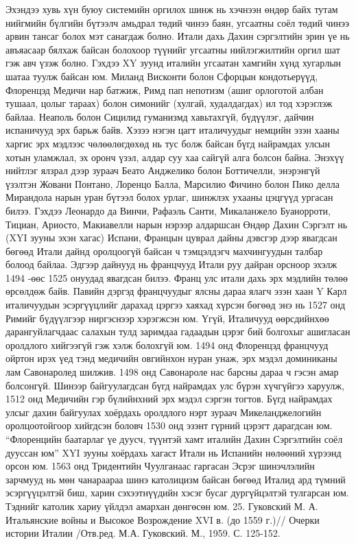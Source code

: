 Эхэндээ хувь хүн буюу системийн оргилох шинж нь хэчнээн өндөр байх тутам нийгмийн бүлгийн бүтээлч амьдрал төдий чинээ баян, угсаатны соёл төдий чинээ арвин тансаг болох мэт санагдаж болно. Итали дахь Дахин сэргэлтийн эрин үе нь авъяасаар бялхаж байсан болохоор түүнийг угсаатны нийлэгжилтийн оргил шат гэж авч үзэж болно. Гэхдээ XY зуунд италийн угсаатан хамгийн хүнд хугарлын шатаа туулж байсан юм. Миланд Висконти болон Сфорцын кондотьерүүд, Флоренцэд Медичи нар батжиж, Римд пап непотизм (ашиг орлоготой албан тушаал, цолыг тараах) болон симонийг (хулгай, худалдагдах) ил тод хэрэглэж байлаа. Неаполь болон Сицилид гуманизмд хавьтахгүй, бүдүүлэг, дайчин испаничууд эрх барьж байв. Хэзээ нэгэн цагт италичуудыг немцийн эзэн хааны харгис эрх мэдлээс чөлөөлөгдөхөд нь тус болж байсан бүгд найрамдах улсын хотын уламжлал, эх оронч үзэл, алдар суу хаа сайгүй алга болсон байна. Энэхүү нийтлэг ялзрал дээр зураач Беато Анджелико болон Боттичелли, энэрэнгүй үзэлтэн Жовани Понтано, Лоренцо Балла, Марсилио Фичино болон Пико делла Мирандола нарын уран бүтээл болох урлаг, шинжлэх ухааны цэцгүүд ургасан билээ.
Гэхдээ Леонардо да Винчи, Рафаэль Санти, Микаланжело Буанорроти, Тициан, Ариосто, Макиавелли нарын нэрээр алдаршсан Өндөр Дахин Сэргэлт нь (XYI зууны эхэн хагас) Испани, Францын цуврал дайны дэвсгэр дээр явагдсан бөгөөд Итали дайнд оролцоогүй байсан ч тэмцэлдэгч махчингуудын талбар болоод байлаа. Эдгээр дайнууд нь францчууд Итали руу дайран орсноор эхэлж 1494 -өөс 1525 онуудад явагдсан билээ. Франц улс итали дахь эрх мэдлийн төлөө өрсөлдөж байв. Павийн дэргэд францчуудыг ялсны дараа ялагч эзэн хаан Y Карл италичуудын эсэргүүцлийг дарахад цэргээ хаяхад хүрсэн бөгөөд энэ нь 1527 онд Римийг бүдүүлгээр ниргэснээр хэрэгжсэн юм.
Үгүй, Италичууд өөрсдийнхөө дарангуйлагчдаас салахын тулд заримдаа гадаадын цэрэг бий болгохыг ашигласан оролдлого хийгээгүй гэж хэлж болохгүй юм. 1494 онд Флоренцэд францчууд ойртон ирэх үед тэнд медичийн овгийнхон нуран унаж, эрх мэдэл доминиканы лам Савонаролед шилжив. 1498 онд Савонароле нас барсны дараа ч гэсэн амар болсонгүй. Шинээр байгуулагдсан бүгд найрамдах улс бүрэн хүчгүйгээ харуулж, 1512 онд Медичийн гэр бүлийнхний эрх мэдэл сэргэн тогтов. Бүгд найрамдах улсыг дахин байгуулах хоёрдахь оролдлого нэрт зураач Микеланджелогийн оролцоотойгоор хийгдсэн боловч 1530 онд эзэнт гүрний цэрэгт дарагдсан юм. “Флоренцийн баатарлаг үе дуусч, түүнтэй хамт италийн Дахин Сэргэлтийн соёл дууссан юм”
XYI зууны хоёрдахь хагаст Итали нь Испанийн нөлөөний хүрээнд орсон юм. 1563 онд Тридентийн Чуулганаас гаргасан Эсрэг шинэчлэлийн зарчмууд нь мөн чанараараа шинэ католицизм байсан бөгөөд Италид ард түмний эсэргүүцэлтэй биш, харин сэхээтнүүдийн хэсэг бусаг дургүйцэлтэй тулгарсан юм. Тэднийг католик хариу үйлдэл амархан дөнгөсөн юм. 25. Гуковский М. А. Итальянские войны и Высокое Возрождение XVI в. (до 1559 г.)// Очерки истории Италии /Отв.ред. М.А. Гуковский. М., 1959. С. 125-152.
